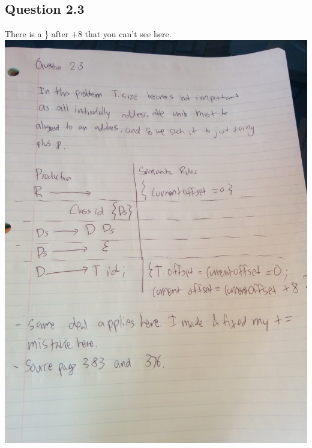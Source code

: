 \documentclass[11pt, oneside]{article}   	%
\begin{document}
\subsection*{Question 2.3}
\par There is a \} after $+8$ that you can't see here.
\\
\includegraphics[scale=0.18]{IMG_20141011_155225.jpg}
\end{document}
